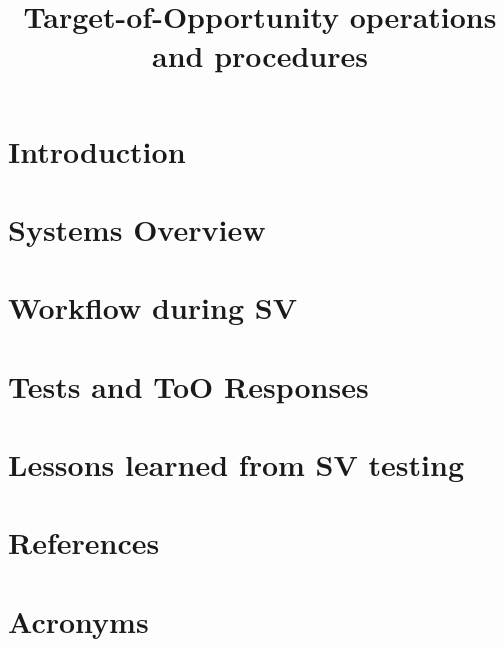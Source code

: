 \documentclass[OPS,lsstdraft,authoryear,toc]{lsstdoc}
\title{Target-of-Opportunity operations and procedures}
\date{\vcsDate}
\begin{document}
\maketitle
\section{Introduction}\label{sec:introduction}

\newpage
\section{Systems Overview}\label{sec:sysOverview}

% 
\newpage
\section{Workflow during SV}\label{sec:workflow}

\newpage
\section{Tests and ToO Responses}\label{sec:ToOEvents}

\newpage
\section{Lessons learned from SV testing}\label{sec:LessonsLearned}


\appendix
\newpage
\section{References} \label{sec:bib}
\renewcommand{\refname}{} %


\newpage
\section{Acronyms} \label{sec:acronyms}

\end{document}
